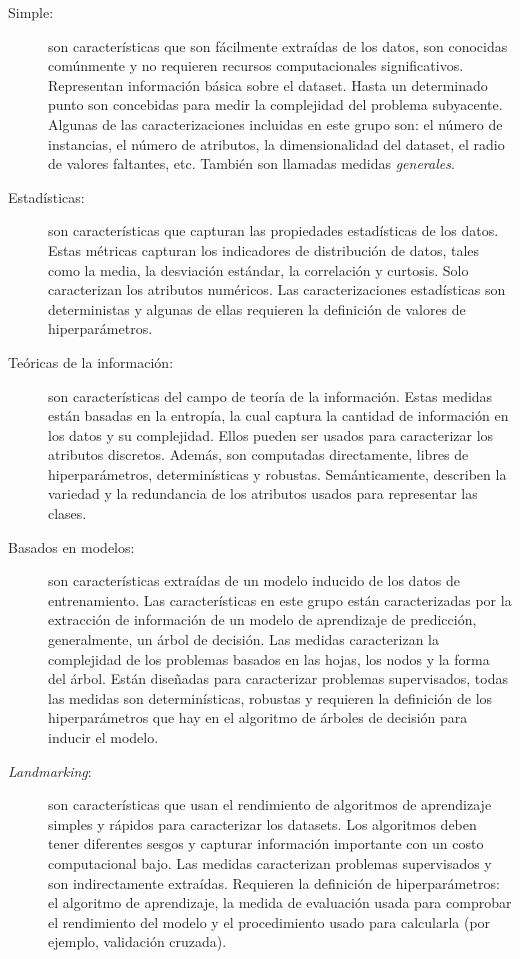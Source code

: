 \begin{description}
	\item[Simple:] son características que son fácilmente extraídas de los datos, son conocidas comúnmente y no requieren recursos computacionales significativos. Representan información básica sobre el dataset. Hasta un determinado punto son concebidas para medir la complejidad del problema subyacente. Algunas de las caracterizaciones incluidas en este grupo son: el número de instancias, el número de atributos, la dimensionalidad del dataset, el radio de valores faltantes, etc. También son llamadas medidas \textit{generales}.
	
	\item[Estadísticas:] son características que capturan las propiedades estadísticas de los datos. Estas métricas capturan los indicadores de distribución de datos, tales como la media, la desviación estándar, la correlación y curtosis. Solo caracterizan los atributos numéricos. Las caracterizaciones estadísticas son deterministas y algunas de ellas requieren la definición de valores de hiperparámetros. %
	
	\item[Teóricas de la información:] son características del campo de teoría de la información. Estas medidas están basadas en la entropía, la cual captura la cantidad de información en los datos y su complejidad. Ellos pueden ser usados para caracterizar los atributos discretos. Además, son computadas directamente, libres de hiperparámetros, determinísticas y robustas. Semánticamente, describen la variedad y la redundancia de los atributos usados para representar las clases.
	
	\item[Basados en modelos:] son características extraídas de un modelo inducido de los datos de entrenamiento. Las características en este grupo están caracterizadas por la extracción de información de un modelo de aprendizaje de predicción, generalmente, un árbol de decisión. Las medidas caracterizan la complejidad de los problemas basados en las hojas, los nodos y la forma del árbol. Están diseñadas para caracterizar problemas supervisados, todas las medidas son determinísticas, robustas y requieren la definición de los hiperparámetros que hay en el algoritmo de árboles de decisión para inducir el modelo.
	
	\item[\textit{Landmarking}:] son características que usan el rendimiento de algoritmos de aprendizaje simples y rápidos para caracterizar los datasets. Los algoritmos deben tener diferentes sesgos y capturar información importante con un costo computacional bajo. Las medidas caracterizan problemas supervisados y son indirectamente extraídas. Requieren la definición de hiperparámetros: el algoritmo de aprendizaje, la medida de evaluación usada para comprobar el rendimiento del modelo y el procedimiento usado para calcularla (por ejemplo, validación cruzada).
\end{description}

